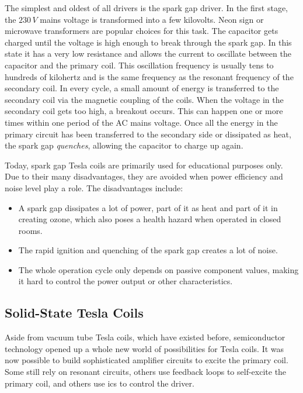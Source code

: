 The simplest and oldest of all drivers is the spark gap driver. In the first stage, the \(230\,V\) mains voltage is transformed into a few kilovolts. Neon sign or microwave transformers are popular choices for this task. The capacitor gets charged until the voltage is high enough to break through the spark gap. In this state it has a very low resistance and allows the current to oscillate between the capacitor and the primary coil. This oscillation frequency is usually tens to hundreds of kilohertz and is the same frequency as the resonant frequency of the secondary coil. In every cycle, a small amount of energy is transferred to the secondary coil via the magnetic coupling of the coils. When the voltage in the secondary coil gets too high, a breakout occurs. This can happen one or more times within one period of the AC mains voltage. Once all the energy in the primary circuit has been transferred to the secondary side or dissipated as heat, the spark gap \emph{quenches}, allowing the capacitor to charge up again.

Today, spark gap Tesla coils are primarily used for educational purposes only. Due to their many disadvantages, they are avoided when power efficiency and noise level play a role. The disadvantages include:

\begin{itemize}
\item A spark gap dissipates a lot of power, part of it as heat and part of it in creating ozone, which also poses a health hazard when operated in closed rooms.
\item The rapid ignition and quenching of the spark gap creates a lot of noise.
\item The whole operation cycle only depends on passive component values, making it hard to control the power output or other characteristics.
\end{itemize}

\subsection{Solid-State Tesla Coils}

Aside from vacuum tube Tesla coils, which have existed before, semiconductor technology opened up a whole new world of possibilities for Tesla coils. It was now possible to build sophisticated amplifier circuits to excite the primary coil. Some still rely on resonant circuits, others use feedback loops to self-excite the primary coil, and others use \glspl{ic} to control the driver.


